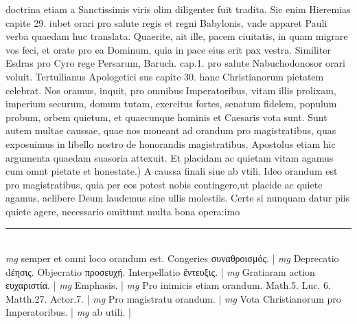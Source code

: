 \documentclass{article}
\begin{document}
\begin{pages}
doctrina etiam a Sanctissimis viris olim diligenter fuit tradita. Sic enim Hieremias capite 29. iubet orari pro salute regis et regni Babylonis, vnde apparet Pauli verba quaedam huc translata. Quaerite, ait ille, pacem ciuitatis, in quam migrare vos feci, et orate pro ea Dominum, quia in pace eius erit pax vestra. Similiter Esdras pro Cyro rege Persarum, Baruch. cap.1. pro salute Nabuchodonosor orari voluit. Tertullianus Apologetici sus capite 30. hanc Christianorum pietatem celebrat. Nos oramus, inquit, pro omnibus Imperatoribus, vitam illis prolixam, imperium securum, domum tutam, exercitus fortes, senatum fidelem, populum probum, orbem quietum, et quaecunque hominis et Caesaris vota sunt. Sunt autem multae caussae, quae nos moueant ad orandum pro magistratibus, quas exposuimus in libello nostro de honorandis magistratibus. Apostolus etiam hic argumenta quaedam suasoria attexuit. Et placidam ac quietam vitam agamus cum omnt pietate et honestate.) A caussa finali siue ab vtili. Ideo orandum est pro magistratibus, quia per eos potest nobis contingere,ut placide ac quiete agamus, aclibere Deum laudemus sine ullis molestiis. Certe si nunquam datur piis quiete agere, necessario omittunt multa bona opera:imo  \pend
\vspace{0.5cm}\noindent
\vspace{0.2cm}\rule{1cm}{0.2pt}\\ 
\hspace{0.2cm}\textit{mg}
\footnotesize semper et omni loco orandum est. Congeries συναθροισμός. 
\normalsize| 
\hspace{0.2cm}\textit{mg}
\footnotesize Deprecatio dέησις. Objecratio προσευχή. Interpellatio ἔντευξις. 
\normalsize| 
\hspace{0.2cm}\textit{mg}
\footnotesize Gratiaram action ευχαριστία. 
\normalsize| 
\hspace{0.2cm}\textit{mg}
\footnotesize Emphasis. 
\normalsize| 
\hspace{0.2cm}\textit{mg}
\footnotesize Pro inimicis etiam orandum. Math.5. Luc. 6. Matth.27. Actor.7. 
\normalsize| 
\hspace{0.2cm}\textit{mg}
\footnotesize Pro magistratu orandum. 
\normalsize| 
\hspace{0.2cm}\textit{mg}
\footnotesize Vota Christianorum pro Imperatoribus. 
\normalsize| 
\hspace{0.2cm}\textit{mg}
\footnotesize ab utili. 
\normalsize| 

\end{pages}
\end{document}
